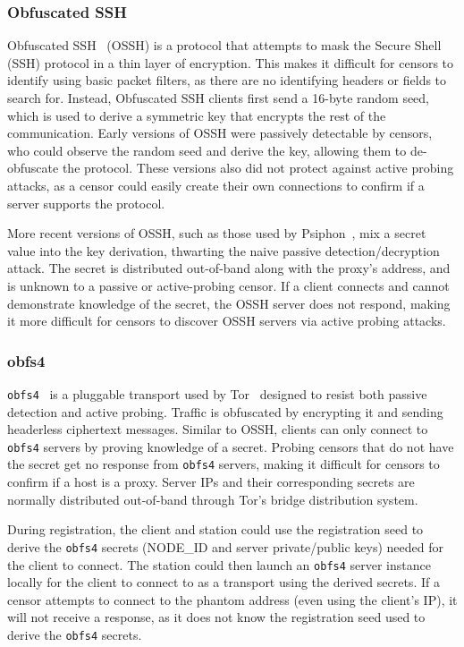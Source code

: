 \documentclass[sigconf]{acmart}
\newcommand{\TODO}[1]{}
\renewcommand{\TODO}[1]{{\color{red} TODO: {#1}}}
\begin{document}
\subsubsection{Obfuscated SSH}
\label{sec:ossh}

Obfuscated SSH~\cite{ossh} (OSSH) is a protocol that attempts to mask the Secure Shell
(SSH) protocol in a thin
layer of encryption. This makes it difficult for censors to identify using basic
packet filters, as there are no identifying headers or fields
to search for. Instead, Obfuscated SSH clients first send a 16-byte random seed, which
is used to derive a symmetric key that encrypts the rest of the
communication. Early versions of OSSH were passively detectable by censors, who
could observe the random seed and derive the key, allowing them to de-obfuscate the protocol.
These versions also did
not protect against active probing attacks, as a censor could easily create their
own connections to confirm if a server supports the protocol.

More recent versions of OSSH, such as those used by Psiphon~\cite{psiphon}, mix a secret
value into the key derivation, thwarting the naive passive detection/decryption
attack. The secret is distributed out-of-band along with the proxy's address,
and is unknown to a passive or active-probing censor. If a client connects and cannot
demonstrate knowledge of
the secret, the OSSH server does not respond, making it more difficult for
censors to discover OSSH servers via active probing attacks.


\subsubsection{obfs4}

\texttt{obfs4}~\cite{obfs4} is a pluggable transport used by
Tor~\cite{tor} designed to resist both passive detection and active probing.
Traffic is obfuscated by encrypting it and sending headerless ciphertext
messages. Similar to OSSH, clients can only connect to \texttt{obfs4}
servers by proving knowledge of a secret. Probing censors that do not have the
secret get no response from \texttt{obfs4} servers, making it difficult for
censors to confirm if a host is a proxy. Server IPs and their corresponding secrets
are normally distributed out-of-band through Tor's bridge distribution system.

During registration, the \scheme client and station could use the registration seed to
derive the \texttt{obfs4} secrets (NODE\_ID and server private/public keys)
needed for the client to connect. The station could then launch an \texttt{obfs4} server
instance locally for the client to connect to as a transport using the
derived secrets. If a censor attempts to connect to the phantom address (even
using the client's IP), it will not receive a response, as it does not know the
registration seed used to derive the \texttt{obfs4} secrets.
\end{document}
